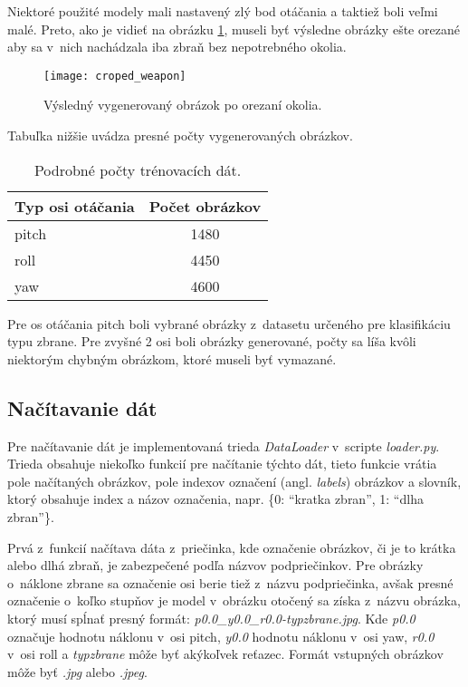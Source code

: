 Niektoré použité modely mali nastavený zlý bod otáčania a taktiež boli veľmi malé.
Preto, ako je vidieť na obrázku \ref{pic:generator3d}, museli byť výsledne obrázky ešte orezané aby sa v~nich nachádzala iba zbraň bez nepotrebného okolia.

\begin{figure}[H]
    \centering
    \texttt{[image: croped\_weapon]}
    \caption{Výsledný vygenerovaný obrázok po orezaní okolia.}
    \label{pic:generator3d}
\end{figure}

Tabuľka nižšie uvádza presné počty vygenerovaných obrázkov.

\begin{table}[H]
    \centering
    \label{my-label}
    \begin{tabular}{|l|c|}
        \hline
        Typ osi otáčania & \multicolumn{1}{l|}{Počet obrázkov} \\ \hline
        pitch            & 1480                                \\ \hline
        roll             & 4450                                \\ \hline
        yaw              & 4600                                \\ \hline
        \end{tabular}
    \caption{Podrobné počty trénovacích dát.}
\end{table}

Pre os otáčania pitch boli vybrané obrázky z~datasetu určeného pre klasifikáciu typu zbrane.
Pre zvyšné 2 osi boli obrázky generované, počty sa líša kvôli niektorým chybným obrázkom, ktoré museli byť vymazané.

\subsection{Načítavanie dát}
\label{subsec:nacitaniedat}
Pre načítavanie dát je implementovaná trieda \textit{DataLoader} v~scripte \textit{loader.py}.
Trieda obsahuje niekoľko funkcií pre načítanie týchto dát, tieto funkcie vrátia pole načítaných obrázkov, pole indexov označení (angl. \textit{labels}) obrázkov a
    slovník, ktorý obsahuje index a názov označenia, napr. \{0: ``kratka zbran'', 1: ``dlha zbran''\}.

Prvá z~funkcií načítava dáta z~priečinka, kde označenie obrázkov, či je to krátka alebo dlhá zbraň, je zabezpečené podľa názvov podpriečinkov.
Pre obrázky o~náklone zbrane sa označenie osi berie tiež z~názvu podpriečinka, avšak presné označenie o~koľko stupňov je model v~obrázku otočený
    sa získa z~názvu obrázka, ktorý musí spĺnať presný formát: \textit{p0.0\_y0.0\_r0.0-typzbrane.jpg}.
Kde \textit{p0.0} označuje hodnotu náklonu v~osi pitch, \textit{y0.0} hodnotu náklonu v~osi yaw, \textit{r0.0} v~osi roll a \textit{typzbrane} môže byť
    akýkoľvek reťazec.
Formát vstupných obrázkov môže byť \textit{.jpg} alebo \textit{.jpeg}.

